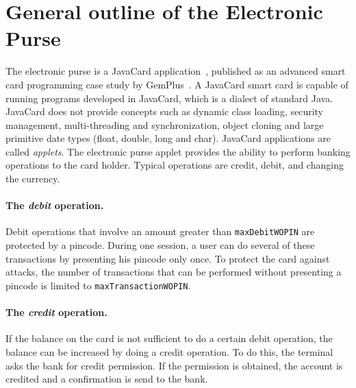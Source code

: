 \documentclass[a4paper]{llncs}
\begin{document}
\section{General outline of the Electronic Purse}
\label{SectGenPurse}

The electronic purse is a JavaCard application~\cite{JavaCardURL}, published
as an advanced smart card programming case study by
GemPlus~\cite{PurseUrl}. A JavaCard smart card is capable of running
programs developed in {JavaCard}, which is a dialect of
standard Java. {JavaCard} does not provide concepts such as dynamic
class loading, security management, multi-threading and
synchronization, object cloning and large primitive date types (float,
double, long and char).  JavaCard applications are called
\emph{applets}.  The electronic purse applet provides  the ability to 
perform banking operations to the card holder. Typical operations are
credit, debit, and changing the currency.

\paragraph{\bf The \textit{debit} operation.} 
Debit operations that involve an amount greater than
\texttt{maxDebitWOPIN} are protected by a pincode. During one session, 
a user can do several of these transactions by presenting his pincode
only once. To protect the card against attacks, the number of
transactions that can be performed without presenting a pincode is
limited to \texttt{maxTransactionWOPIN}.




\paragraph{\bf The \textit{credit} operation.} 
If the balance on the card is not sufficient to do a certain debit
operation, the balance can be increased by doing a credit
operation. To do this, the terminal asks the bank for credit
permission. If the permission is obtained, the account is credited and 
a confirmation is send to the bank.
\end{document}
